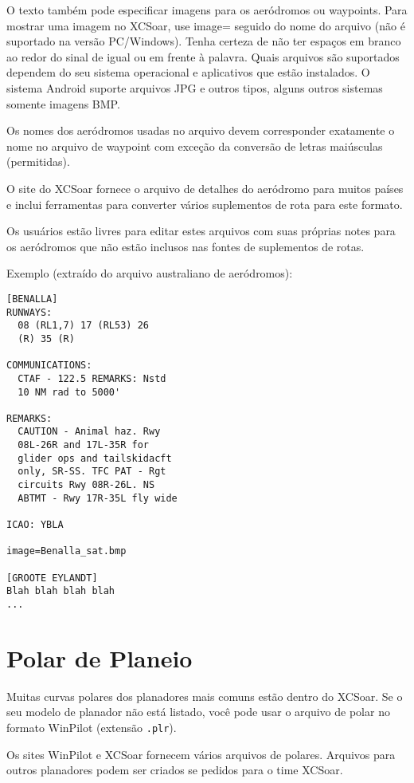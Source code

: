 O texto também pode especificar imagens para os aeródromos ou waypoints.  Para mostrar uma imagem no XCSoar, use image= seguido do nome do arquivo (não é suportado na versão PC/Windows).  Tenha certeza de não ter espaços em branco ao redor do sinal de igual ou em frente à palavra.  Quais arquivos são suportados dependem do seu sistema operacional e aplicativos que estão instalados.  O sistema Android suporte arquivos JPG e outros tipos, alguns outros sistemas somente imagens BMP.

Os nomes dos aeródromos usadas no arquivo devem corresponder exatamente o nome no arquivo de waypoint com exceção da conversão de letras maiúsculas (permitidas).

O site do XCSoar fornece o arquivo de detalhes do aeródromo para muitos países e inclui ferramentas para converter vários suplementos de rota para este formato.

Os usuários estão livres para editar estes arquivos com suas próprias notes para os aeródromos que não estão inclusos nas fontes de suplementos de rotas.

Exemplo (extraído do arquivo australiano de aeródromos):

\begin{verbatim}
[BENALLA]
RUNWAYS:
  08 (RL1,7) 17 (RL53) 26
  (R) 35 (R)

COMMUNICATIONS:
  CTAF - 122.5 REMARKS: Nstd
  10 NM rad to 5000'

REMARKS:
  CAUTION - Animal haz. Rwy
  08L-26R and 17L-35R for
  glider ops and tailskidacft
  only, SR-SS. TFC PAT - Rgt
  circuits Rwy 08R-26L. NS
  ABTMT - Rwy 17R-35L fly wide

ICAO: YBLA

image=Benalla_sat.bmp

[GROOTE EYLANDT]
Blah blah blah blah
...
\end{verbatim}

\section{Polar de Planeio} \label{sec:glide-polar}

Muitas curvas polares dos planadores mais comuns estão dentro do XCSoar.  Se o seu modelo de planador não está listado, você pode usar o arquivo de polar no formato WinPilot (extensão  \verb|.plr|).

Os sites WinPilot e XCSoar fornecem vários arquivos de polares.  Arquivos para outros planadores podem ser criados se pedidos para o time XCSoar.

